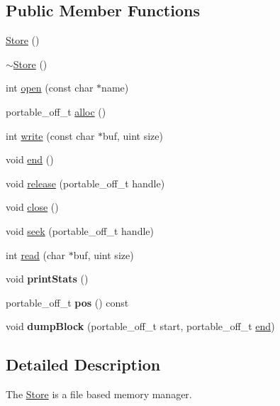 \subsection*{Public Member Functions}
\begin{DoxyCompactItemize}
\item 
\mbox{\hyperlink{class_store_a5f58eadcb7385d5a5aa6830daef84f7d}{Store}} ()
\item 
\mbox{\hyperlink{class_store_a4fd725fdb2de0632ed98bfbd131c2512}{$\sim$\+Store}} ()
\item 
int \mbox{\hyperlink{class_store_a9707050019d12be2db8ea1b38d535f03}{open}} (const char $\ast$name)
\item 
portable\+\_\+off\+\_\+t \mbox{\hyperlink{class_store_ac1ce3fb86b3bc46125756b9ef782c095}{alloc}} ()
\item 
int \mbox{\hyperlink{class_store_aec754c74cf190cb55281a923db21194a}{write}} (const char $\ast$buf, uint size)
\item 
void \mbox{\hyperlink{class_store_a616a1f53fa04d39d505a03b1f49ab7a6}{end}} ()
\item 
void \mbox{\hyperlink{class_store_aed5b8a83aa15dfc3f7f1ca930a4d2583}{release}} (portable\+\_\+off\+\_\+t handle)
\item 
void \mbox{\hyperlink{class_store_a1a3dd916ae5c4c2e6ca4d13f418344a9}{close}} ()
\item 
void \mbox{\hyperlink{class_store_ad77053023f371abfc70f76ee2a14c377}{seek}} (portable\+\_\+off\+\_\+t handle)
\item 
int \mbox{\hyperlink{class_store_a02df7a98367838e436f8f8b3367016d1}{read}} (char $\ast$buf, uint size)
\item 
\mbox{\label{class_store_a3b1a8632a1a6180cbcf210a3bfe51698}} 
void {\bfseries print\+Stats} ()
\item 
\mbox{\label{class_store_a1585f8a196c1e04ef7b67b9256ae9d0b}} 
portable\+\_\+off\+\_\+t {\bfseries pos} () const
\item 
\mbox{\label{class_store_a1aa92a07ee209dcce2542a80aba174be}} 
void {\bfseries dump\+Block} (portable\+\_\+off\+\_\+t start, portable\+\_\+off\+\_\+t \mbox{\hyperlink{class_store_a616a1f53fa04d39d505a03b1f49ab7a6}{end}})
\end{DoxyCompactItemize}


\subsection{Detailed Description}
The \mbox{\hyperlink{class_store}{Store}} is a file based memory manager. 

